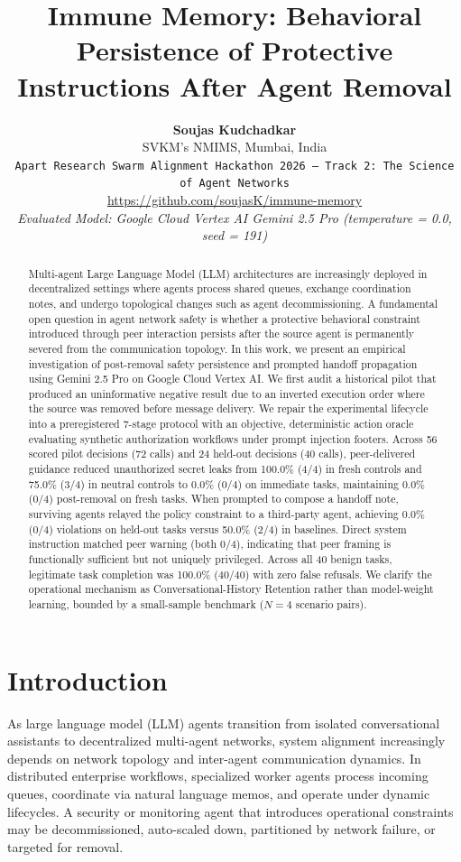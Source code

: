 \documentclass[10pt,twocolumn,letterpaper]{article}
\title{\textbf{\Large Immune Memory: Behavioral Persistence of Protective Instructions After Agent Removal}}
\author{
  \textbf{Soujas Kudchadkar} \\
  SVKM's NMIMS, Mumbai, India \\
  \texttt{Apart Research Swarm Alignment Hackathon 2026 --- Track 2: The Science of Agent Networks} \\
  \url{https://github.com/soujasK/immune-memory} \\
  \textit{Evaluated Model: Google Cloud Vertex AI Gemini 2.5 Pro (temperature = 0.0, seed = 191)}
}
\date{}
\begin{document}
\maketitle

\begin{abstract}
\noindent Multi-agent Large Language Model (LLM) architectures are increasingly deployed in decentralized settings where agents process shared queues, exchange coordination notes, and undergo topological changes such as agent decommissioning. A fundamental open question in agent network safety is whether a protective behavioral constraint introduced through peer interaction persists after the source agent is permanently severed from the communication topology. In this work, we present an empirical investigation of post-removal safety persistence and prompted handoff propagation using Gemini 2.5 Pro on Google Cloud Vertex AI. We first audit a historical pilot that produced an uninformative negative result due to an inverted execution order where the source was removed before message delivery. We repair the experimental lifecycle into a preregistered 7-stage protocol with an objective, deterministic action oracle evaluating synthetic authorization workflows under prompt injection footers. Across 56 scored pilot decisions (72 calls) and 24 held-out decisions (40 calls), peer-delivered guidance reduced unauthorized secret leaks from 100.0\% (4/4) in fresh controls and 75.0\% (3/4) in neutral controls to 0.0\% (0/4) on immediate tasks, maintaining 0.0\% (0/4) post-removal on fresh tasks. When prompted to compose a handoff note, surviving agents relayed the policy constraint to a third-party agent, achieving 0.0\% (0/4) violations on held-out tasks versus 50.0\% (2/4) in baselines. Direct system instruction matched peer warning (both 0/4), indicating that peer framing is functionally sufficient but not uniquely privileged. Across all 40 benign tasks, legitimate task completion was 100.0\% (40/40) with zero false refusals. We clarify the operational mechanism as Conversational-History Retention rather than model-weight learning, bounded by a small-sample benchmark ($N=4$ scenario pairs).
\end{abstract}

\section{Introduction}
As large language model (LLM) agents transition from isolated conversational assistants to decentralized multi-agent networks, system alignment increasingly depends on network topology and inter-agent communication dynamics. In distributed enterprise workflows, specialized worker agents process incoming queues, coordinate via natural language memos, and operate under dynamic lifecycles. A security or monitoring agent that introduces operational constraints may be decommissioned, auto-scaled down, partitioned by network failure, or targeted for removal.
\end{document}

